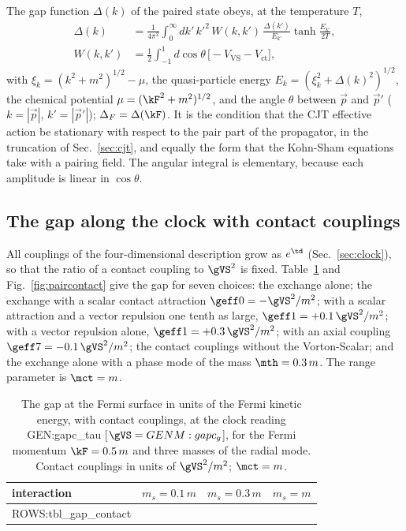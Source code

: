 The gap function $\Delta(k)$ of the paired state obeys, at the temperature $T$,
\begin{equation}
\begin{aligned}
\Delta(k)&=\frac{1}{4\pi^{2}}\int_0^\infty dk'\,k'^{2}\,W(k,k')\,\frac{\Delta(k')}{E_{k'}}\tanh\frac{E_{k'}}{2T},\\
W(k,k')&=\frac12\int_{-1}^{1}d\cos\theta\,\big[-V_{\mathrm{VS}}-V_{\mathrm{ct}}\big],
\end{aligned}
\label{eq:gapeq}
\end{equation}
with $\xi_k=(k^{2}+m^{2})^{1/2}-\mu$, the quasi-particle energy $E_k=(\xi_k^{2}+\Delta(k)^{2})^{1/2}$,
the chemical potential $\mu=(\kF^{2}+m^{2})^{1/2}$, and the angle $\theta$ between $\vec p$ and
$\vec p'$ ($k=|\vec p|$, $k'=|\vec p'|$); $\Delta_F=\Delta(\kF)$. It is the condition that the CJT
effective action be stationary with respect to the pair part of the propagator, in the truncation
of Sec.~\ref{sec:cjt}, and equally the form that the Kohn-Sham equations take with a pairing field.
The angular integral is elementary, because each amplitude is linear in $\cos\theta$.

\subsection{The gap along the clock with contact couplings}

All couplings of the four-dimensional description grow as $e^{\td}$ (Sec.~\ref{sec:clock}), so that
the ratio of a contact coupling to $\gVS^{2}$ is fixed. Table~\ref{tab:gapcontact} and
Fig.~\ref{fig:paircontact} give the gap for seven choices: the exchange alone; the exchange with a
scalar contact attraction $\geff0=-\gVS^{2}/m^{2}$; with a scalar attraction and a vector repulsion
one tenth as large, $\geff1=+0.1\,\gVS^{2}/m^{2}$; with a vector repulsion alone,
$\geff1=+0.3\,\gVS^{2}/m^{2}$; with an axial coupling $\geff7=-0.1\,\gVS^{2}/m^{2}$; the contact
couplings without the Vorton-Scalar; and the exchange alone with a phase mode of the mass
$\mth=0.3\,m$. The range parameter is $\mct=m$.

\begin{table}
\caption{\label{tab:gapcontact}The gap at the Fermi surface in units of the Fermi kinetic energy,
with contact couplings, at the clock reading {{GEN:gapc_tau}} [$\gVS={{GENM:gapc_g}}$], for the Fermi
momentum $\kF=0.5\,m$ and three masses of the radial mode. Contact couplings in units of
$\gVS^{2}/m^{2}$; $\mct=m$.}
\begin{ruledtabular}
\begin{tabular}{lccc}
interaction & $m_s=0.1\,m$ & $m_s=0.3\,m$ & $m_s=m$ \\
\hline
{{ROWS:tbl_gap_contact}}
\end{tabular}
\end{ruledtabular}
\end{table}

